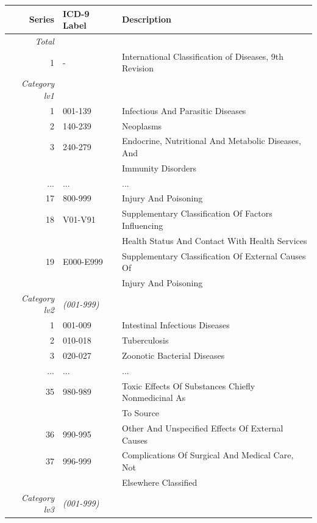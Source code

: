 \newpage 

\begin{table}[h!]
	\centering
	\begin{tabular}{|rll|} 
		\hline
		\textbf{Series} & \textbf{ICD-9 Label}  & \textbf{Description}\\ [0.5ex] 
		
		\hline\hline
		\textit{Total}&&\\
		
		1 & -  & International Classification of Diseases, 9th Revision \\ 
		
		\hline    
		\textit{Category lv1}&&\\
		
		1 &001-139  &Infectious And Parasitic Diseases\\
		2 &140-239  &Neoplasms\\
		3 &240-279  &Endocrine, Nutritional And Metabolic Diseases, And \\
		&& Immunity Disorders\\
		...&...&...\\
		17 &800-999  &Injury And Poisoning\\
		18 &V01-V91  &Supplementary Classification Of Factors Influencing \\
		&&Health Status And Contact With Health Services\\
		19 &E000-E999  &Supplementary Classification Of External Causes Of\\
		&& Injury And Poisoning\\
		
		\hline    
		\textit{Category lv2}&\textit{(001-999)}&\\
		
		1 &001-009  &Intestinal Infectious Diseases\\
		2 &010-018  &Tuberculosis\\
		3 &020-027  &Zoonotic Bacterial Diseases\\
		...&...&...\\
		35 &980-989  &Toxic Effects Of Substances Chiefly Nonmedicinal As\\ 
		&&To Source\\
		36 &990-995  &Other And Unspecified Effects Of External Causes\\
		37 &996-999  &Complications Of Surgical And Medical Care, Not \\
		&&Elsewhere Classified\\
		
		\hline    
		\textit{Category lv3}&\textit{(001-999)}&\\
		

\end{tabular}
\end{table}
